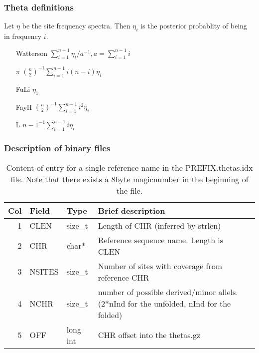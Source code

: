 \documentclass[10pt]{article}
\begin{document}
\subsubsection{Theta definitions}
Let $\eta$ be the site frequency spectra. Then $\eta_i$ is the posterior probablity of being in frequency $i$. 
\begin{itemize}
\item[Watterson] $\sum_{i=1}^{n-1}\eta_i/a^{-1}, a=\sum_{i=1}^{n-1}i$
\item[$\pi$] $ {{n}\choose{2}}^{-1}\sum_{i=1}^{n-1}i(n-i)\eta_i$
\item[FuLi] $\eta_1$
\item[FayH] $ {{n}\choose{2}}^{-1}\sum_{i=1}^{n-1}i^2\eta_i$ 
\item[L] $ {n-1}^{-1}\sum_{i=1}^{n-1}i\eta_i$ 
\end{itemize}

\subsubsection{Description of binary files}


\begin{table}[ht]
\begin{tabular}{rllll}
  \hline
  {\bf Col} & {\bf Field} & {\bf Type} & {\bf Brief description} \\
  \hline
  1 & {\sf CLEN} & size\_t &  Length of CHR (inferred by strlen)\\
  2 & {\sf CHR} & char* & Reference sequence name. Length is CLEN\\
  3 & {\sf NSITES} & size\_t & Number of sites with coverage from reference CHR\\
  4 & {\sf NCHR} & size\_t & number of possible derived/minor allels. (2*nInd for the unfolded, nInd for the folded)\\
  5 & {\sf OFF} & long int & CHR offset into the thetas.gz \\
  \hline
\end{tabular}\label{thetaidx}
\caption{Content of entry for a single reference name in the PREFIX.thetas.idx file. Note that there exists a 8byte magicnumber in the beginning of the file.}
\end{table}
\end{document}
